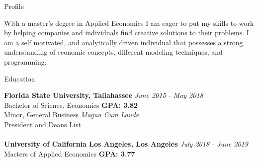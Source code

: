 \documentclass{resume} %
\begin{document}
\begin{rSection}{Profile}

With a master’s degree in Applied Economics I am eager to put my skills to work by helping companies and individuals find creative solutions to their problems. I am a self motivated, and analytically driven individual that possesses a strong understanding of economic concepts, different modeling techniques, and programming. 

\end{rSection}

\begin{rSection}{Education}

{\bf Florida State University, Tallahassee} \hfill {\em June 2015 - May 2018} 
\\ Bachelor of Science, Economics \hfill { \bf GPA: 3.82}
\\ Minor, General Business \hfill {\em Magna Cum Laude}
\\ President and Deans List\\
\\{\bf University of California Los Angeles, Los Angeles} \hfill {\em July 2018 - June 2019} 
\\ Masters of Applied Economics\hfill { \bf GPA: 3.77 }

\end{rSection}
\end{document}
